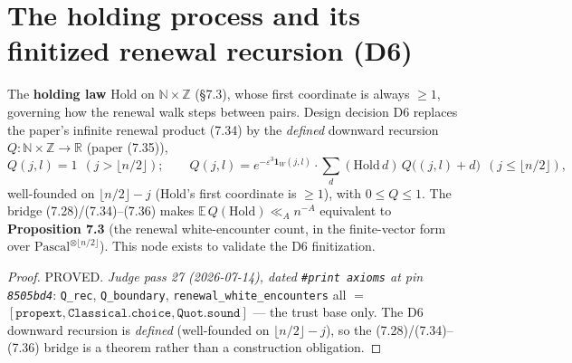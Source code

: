 \section{The holding process and its finitized renewal recursion (D6)}

\begin{proposition}\label{X4}
  \leanok
The \textbf{holding law} \(\mathrm{Hold}\) on \(\mathbb{N}\times\mathbb{Z}\) (§7.3), whose first
coordinate is always \(\ge 1\), governing how the renewal walk steps between pairs.  Design
decision D6 replaces the paper's infinite renewal product (7.34) by the \emph{defined}
downward recursion \(Q:\mathbb{N}\times\mathbb{Z}\to\mathbb{R}\) (paper (7.35)),
\[
  Q(j,l) = 1 \ \ (j>\lfloor n/2\rfloor); \qquad
  Q(j,l) = e^{-\varepsilon^3\mathbf 1_W(j,l)}\cdot\!\!\sum_{d}\!(\mathrm{Hold}\,d)\,Q\bigl((j,l)+d\bigr)
  \ \ (j\le\lfloor n/2\rfloor),
\]
well-founded on \(\lfloor n/2\rfloor - j\) (Hold's first coordinate is \(\ge 1\)), with
\(0\le Q\le 1\).  The bridge (7.28)/(7.34)--(7.36) makes
\(\mathbb{E}\,Q(\mathrm{Hold})\ll_A n^{-A}\) equivalent to \textbf{Proposition 7.3}
(the renewal white-encounter count, in the finite-vector form over \(\mathrm{Pascal}^{\otimes\lfloor n/2\rfloor}\)).
This node exists to validate the D6 finitization.
\end{proposition}

\begin{proof}
  \leanok
  PROVED.  \emph{Judge pass 27 (2026-07-14), dated \texttt{\#print axioms} at pin
  \texttt{8505bd4}}: \texttt{Q\_rec}, \texttt{Q\_boundary},
  \texttt{renewal\_white\_encounters} all \(=\)
  \([\texttt{propext}, \texttt{Classical.choice}, \texttt{Quot.sound}]\) --- the trust base
  only.  The D6 downward recursion is \emph{defined} (well-founded on
  \(\lfloor n/2\rfloor - j\)), so the (7.28)/(7.34)--(7.36) bridge is a theorem rather than a
  construction obligation.
\end{proof}

